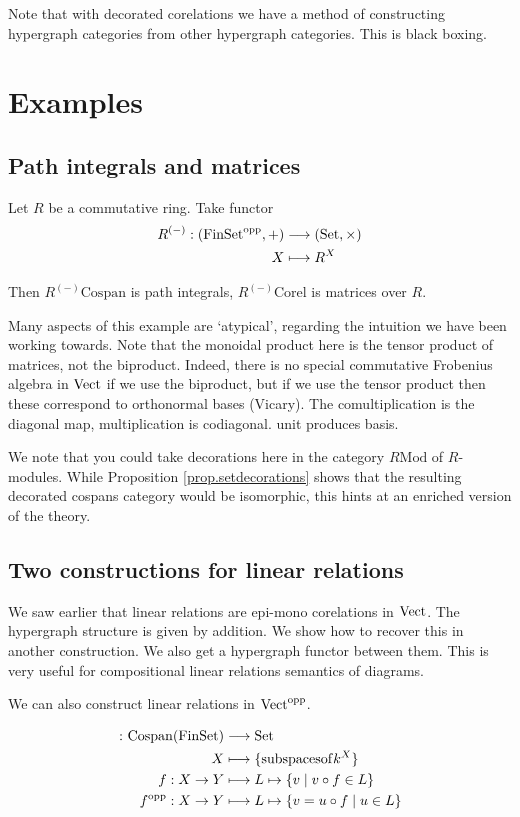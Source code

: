 Note that with decorated corelations we have a method of constructing hypergraph
categories from other hypergraph categories. This is black boxing. 

\section{Examples} \label{sec:excor}
\subsection{Path integrals and matrices}

Let $R$ be a commutative ring. Take functor
\begin{align*}
  R^{(-)}: (\mathrm{FinSet}^{\mathrm{opp}},+) &\longrightarrow (\mathrm{Set},\times) \\
  X &\longmapsto R^X
\end{align*}

Then $R^{(-)}\mathrm{Cospan}$ is path integrals, $R^{(-)}\mathrm{Corel}$ is
matrices over $R$. 

Many aspects of this example are `atypical', regarding the intuition we have
been working towards.
Note that the monoidal product here is the tensor product of
matrices, not the biproduct. Indeed, there is no special commutative Frobenius
algebra in $\mathrm{Vect}$ if we use the biproduct, but if we use the tensor product
then these correspond to orthonormal bases (Vicary). The comultiplication is the
diagonal map, multiplication is codiagonal. unit produces basis.

We note that you could take decorations here in the category $R\mathrm{Mod}$ of
$R$-modules. While Proposition \ref{prop.setdecorations} shows that the
resulting decorated cospans category would be isomorphic, this hints at an
enriched version of the theory.

\subsection{Two constructions for linear relations}

We saw earlier that linear relations are epi-mono corelations in $\mathrm{Vect}$. The
hypergraph structure is given by addition. We show how to recover this in
another construction. We also get a hypergraph functor between them. This is
very useful for compositional linear relations semantics of diagrams.

We can also construct linear relations in $\mathrm{Vect}^{\mathrm{opp}}$.

\begin{align*}
  {\colon}\mathrm{Cospan}(\mathrm{FinSet}) &\longrightarrow \mathrm{Set} \\
  X &\longmapsto \{\mathrm{subspaces of }k^X\} \\
  f: X \to Y &\longmapsto L \mapsto \{v \mid v\circ f \in L\} \\
  f^{\mathrm{opp}}: X \to Y &\longmapsto L \mapsto \{v = u \circ f \mid u \in L\}
\end{align*}

